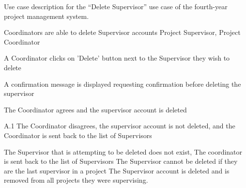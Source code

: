 \begin{table}
  \centering
  \caption{Use case description for the ``Delete Supervisor'' use case of the fourth-year project management system.}
  \label{tbl:use-case-delete-supervisor}

  \begin{usecase}
    Coordinators are able to delete Supervisor accounts
    Project Supervisor, Project Coordinator
    \ucnormal
    \begin{ucenum}
      \item A Coordinator clicks on 'Delete' button next to the Supervisor they wish to delete
      \item A confirmation message is displayed requesting confirmation before deleting the supervisor
      \item The Coordinator agrees and the supervisor account is deleted
    \end{ucenum}
    \begin{ucenum*}
      \item [A.1] The Coordinator disagrees, the supervisor account is not deleted, and the Coordinator is sent back to the list of Supervisors
    \end{ucenum*}
    The Supervisor that is attempting to be deleted does not exist, The coordinator is sent back to the list of Supervisors
    The Supervisor cannot be deleted if they are the last supervisor in a project
    The Supervisor account is deleted and is removed from all projects they were supervising.
  \end{usecase}
\end{table}


